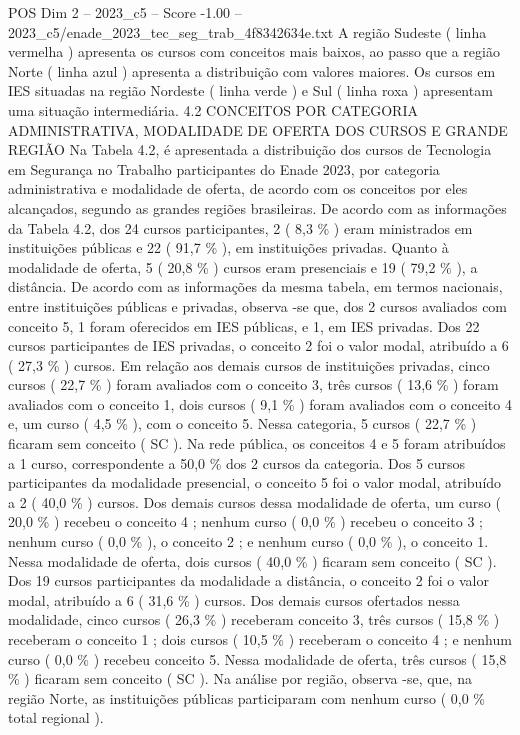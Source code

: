 \begin{textsample}{POS Dim 2 – 2023\_c5 – Score -1.00 – 2023\_c5/enade\_2023\_tec\_seg\_trab\_4f8342634e.txt}
A região Sudeste ( linha vermelha ) apresenta os cursos com conceitos mais baixos, ao passo que a região Norte ( linha azul ) apresenta a distribuição com valores maiores.
Os cursos em IES situadas na região Nordeste ( linha verde ) e Sul ( linha roxa ) apresentam uma situação intermediária. 4.2 CONCEITOS POR CATEGORIA ADMINISTRATIVA, MODALIDADE DE OFERTA DOS CURSOS E GRANDE REGIÃO Na Tabela 4.2, é apresentada a distribuição dos cursos de Tecnologia em Segurança no Trabalho participantes do Enade 2023, por categoria administrativa e modalidade de oferta, de acordo com os conceitos por eles alcançados, segundo as grandes regiões brasileiras.
De acordo com as informações da Tabela 4.2, dos 24 cursos participantes, 2 ( 8,3 \% ) eram ministrados em instituições públicas e 22 ( 91,7 \% ), em instituições privadas.
Quanto à modalidade de oferta, 5 ( 20,8 \% ) cursos eram presenciais e 19 ( 79,2 \% ), a distância.
De acordo com as informações da mesma tabela, em termos nacionais, entre instituições públicas e privadas, observa -se que, dos 2 cursos avaliados com conceito 5, 1 foram oferecidos em IES públicas, e 1, em IES privadas.
Dos 22 cursos participantes de IES privadas, o conceito 2 foi o valor modal, atribuído a 6 ( 27,3 \% ) cursos.
Em relação aos demais cursos de instituições privadas, cinco cursos ( 22,7 \% ) foram avaliados com o conceito 3, três cursos ( 13,6 \% ) foram avaliados com o conceito 1, dois cursos ( 9,1 \% ) foram avaliados com o conceito 4 e, um curso ( 4,5 \% ), com o conceito 5.
Nessa categoria, 5 cursos ( 22,7 \% ) ficaram sem conceito ( SC ).
Na rede pública, os conceitos 4 e 5 foram atribuídos a 1 curso, correspondente a 50,0 \% dos 2 cursos da categoria.
Dos 5 cursos participantes da modalidade presencial, o conceito 5 foi o valor modal, atribuído a 2 ( 40,0 \% ) cursos.
Dos demais cursos dessa modalidade de oferta, um curso ( 20,0 \% ) recebeu o conceito 4 ; nenhum curso ( 0,0 \% ) recebeu o conceito 3 ; nenhum curso ( 0,0 \% ), o conceito 2 ; e nenhum curso ( 0,0 \% ), o conceito 1.
Nessa modalidade de oferta, dois cursos ( 40,0 \% ) ficaram sem conceito ( SC ).
Dos 19 cursos participantes da modalidade a distância, o conceito 2 foi o valor modal, atribuído a 6 ( 31,6 \% ) cursos.
Dos demais cursos ofertados nessa modalidade, cinco cursos ( 26,3 \% ) receberam conceito 3, três cursos ( 15,8 \% ) receberam o conceito 1 ; dois cursos ( 10,5 \% ) receberam o conceito 4 ; e nenhum curso ( 0,0 \% ) recebeu conceito 5.
Nessa modalidade de oferta, três cursos ( 15,8 \% ) ficaram sem conceito ( SC ).
Na análise por região, observa -se, que, na região Norte, as instituições públicas participaram com nenhum curso ( 0,0 \% total regional ).

\end{textsample}
